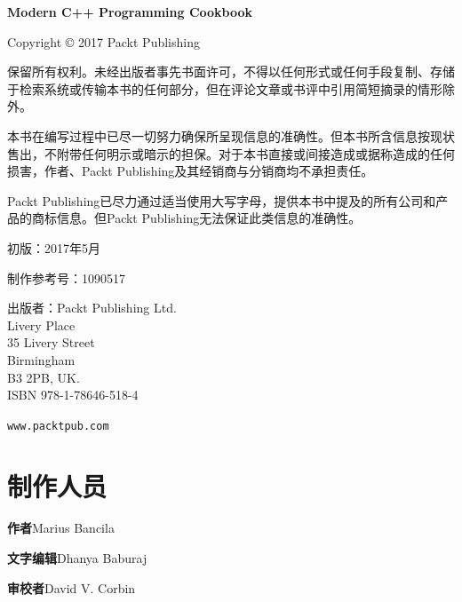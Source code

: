 \begin{myCopyright}

\textbf{Modern C++ Programming Cookbook}



Copyright © 2017 Packt Publishing



保留所有权利。未经出版者事先书面许可，不得以任何形式或任何手段复制、存储于检索系统或传输本书的任何部分，但在评论文章或书评中引用简短摘录的情形除外。



本书在编写过程中已尽一切努力确保所呈现信息的准确性。但本书所含信息按现状售出，不附带任何明示或暗示的担保。对于本书直接或间接造成或据称造成的任何损害，作者、Packt Publishing及其经销商与分销商均不承担责任。



Packt Publishing已尽力通过适当使用大写字母，提供本书中提及的所有公司和产品的商标信息。但Packt Publishing无法保证此类信息的准确性。



初版：2017年5月



制作参考号：1090517



出版者：Packt Publishing Ltd.\\
Livery Place\\
35 Livery Street\\
Birmingham\\
B3 2PB, UK.\\
ISBN 978-1-78646-518-4



\texttt{www.\allowbreak{}packtpub.\allowbreak{}com}


\end{myCopyright}
\clearpage
\begingroup\setlength{\parindent}{0bp}

\section*{制作人员}



\textbf{作者}Marius Bancila



\textbf{文字编辑}Dhanya Baburaj



\textbf{审校者}David V. Corbin



